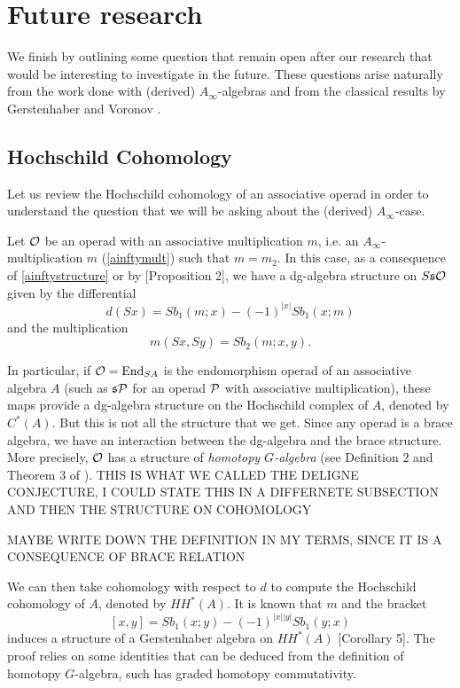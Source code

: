 \documentclass[join.tex]{subfiles}
\begin{document}
\section{Future research}

We finish by outlining some question that remain open after our research that would be interesting to investigate in the future. These questions arise naturally from the work done with (derived) $A_\infty$-algebras and from the classical results by Gerstenhaber and Voronov \cite{GV}.

\subsection{Hochschild Cohomology}
Let us review the Hochschild cohomology of an associative operad in order to understand the question that we will be asking about the (derived) $A_\infty$-case.

Let ${\mathcal O}$ be an operad with an associative multiplication $m$, i.e. an $A_\infty$-multiplication $m$ (\cref{ainftymult}) such that $m=m_2$. In this case, as a consequence of \cref{ainftystructure} or by \cite{GV}[Proposition 2], we have a dg-algebra structure on $S\mathfrak{s}{\mathcal O}$ given by the differential
\[d(Sx) =  Sb_1(m; x) -(-1)^{|x|}Sb_1(x; m)\]
and the multiplication
\[m(Sx,Sy) = Sb_2(m;x,y).\]

In particular, if ${\mathcal O} = \operatorname{End}_{SA}$ is the endomorphism operad of an associative algebra $A$ (such as $\mathfrak{s}\mathcal{P}$ for an operad $\mathcal{P}$ with associative multiplication), these maps provide a dg-algebra structure on the Hochschild complex of $A$, denoted by $C^*(A)$. But this is not all the structure that we get. Since any operad is a brace algebra, we have an interaction between the dg-algebra and the brace structure. More precisely, ${\mathcal O}$ has a structure of \emph{homotopy $G$-algebra} (see Definition 2 and Theorem 3 of \cite{GV}). THIS IS WHAT WE CALLED THE DELIGNE CONJECTURE, I COULD STATE THIS IN A DIFFERNETE SUBSECTION AND THEN THE STRUCTURE ON COHOMOLOGY

MAYBE WRITE DOWN THE DEFINITION IN MY TERMS, SINCE IT IS A CONSEQUENCE OF BRACE RELATION

 We can then take cohomology with respect to $d$ to compute the Hochschild cohomology of $A$, denoted by $HH^*(A)$. It is known that $m$ and the bracket 
\[[x,y]=Sb_1(x; y) -(-1)^{|x||y|}Sb_1(y; x)\]
induces a structure of a Gerstenhaber algebra on $HH^*(A)$ \cite{GV}[Corollary 5]. The proof relies on some identities that can be deduced from the definition of homotopy $G$-algebra, such has graded homotopy commutativity. 
\end{document}
